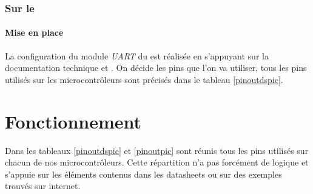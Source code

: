 			\subsubsection{Sur le \dspic}
			\paragraph{Mise en place}La configuration du module \textit{UART} du \dspic est réalisée en s'appuyant sur la documentation technique \cite{DatasheetDSPIC} et \cite{DatasheetDSPIC30} . On décide les pins que l'on va utiliser, tous les pins utilisés sur les microcontrôleurs sont précisés dans le tableau \ref{pinoutdspic}.
			
			
		\section{Fonctionnement}
		Dans les tableaux \ref{pinoutdspic} et \ref{pinoutpic} sont réunis tous les pins utilisés sur chacun de nos microcontrôleurs. Cette répartition n'a pas forcément de logique et s'appuie sur les éléments contenus dans les datasheets ou sur des exemples trouvés sur internet.\\
